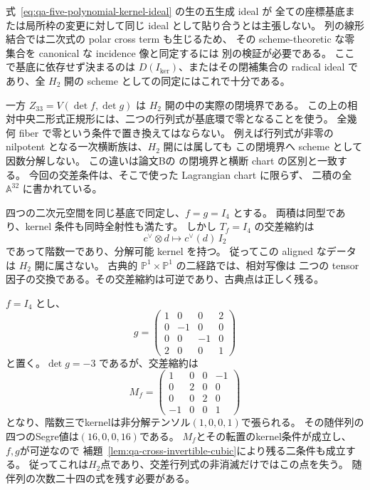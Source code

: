 \begin{remark}[idealのscheme構造と閉境界を区別する]
式~\eqref{eq:qa-five-polynomial-kernel-ideal} の生の五生成 ideal が
全ての座標基底または局所枠の変更に対して同じ ideal として貼り合うとは主張しない。
列の線形結合では二次式の polar cross term も生じるため、
その scheme-theoretic な零集合を canonical な incidence 像と同定するには
別の検証が必要である。
ここで基底に依存せず決まるのは $D(I_{\mathrm{ker}})$、またはその閉補集合の
radical ideal であり、全 $H_2$ 開の scheme としての同定にはこれで十分である。

一方 $Z_{33}=V(\det f,\det g)$ は $H_2$ 開の中の実際の閉境界である。
この上の相対中央二形式正規形には、二つの行列式が基底環で零となることを使う。
全幾何 fiber で零という条件で置き換えてはならない。
例えば行列式が非零の nilpotent となる一次横断族は、$H_2$ 開には属しても
この閉境界へ scheme として因数分解しない。
この違いは論文Bの
\cite[\texttt{prop:lagrangian-relative-double-rank-three},
\texttt{cor:lagrangian-open-closed-recognition}]{QuadricModuli2026}
の閉境界と横断 chart の区別と一致する。
今回の交差条件は、そこで使った Lagrangian chart に限らず、
二積の全 $\mathbb A^{32}$ に書かれている。
\end{remark}

\begin{example}[二積の可逆性だけでは足りない]
四つの二次元空間を同じ基底で同定し、$f=g=I_4$ とする。
両積は同型であり、kernel 条件も同時全射性も満たす。
しかし $T_f=I_4$ の交差縮約は
\[
 c^\vee\otimes d\longmapsto c^\vee(d)\,I_2
\]
であって階数一であり、分解可能 kernel を持つ。
従ってこの aligned なデータは $H_2$ 開に属さない。
古典的 $\mathbb P^1\times\mathbb P^1$ の二経路では、相対写像は
二つの tensor 因子の交換である。その交差縮約は可逆であり、古典点は正しく残る。
\end{example}


\begin{example}[次数二十四の条件が必要となる点]
$f=I_4$ とし、
\[
 g=\begin{pmatrix}
 1&0&0&2\\0&-1&0&0\\0&0&-1&0\\2&0&0&1
 \end{pmatrix}
\]
と置く。$\det g=-3$ であるが、交差縮約は
\[
 M_f=\begin{pmatrix}
 1&0&0&-1\\0&2&0&0\\0&0&2&0\\-1&0&0&1
 \end{pmatrix}
\]
となり、階数三でkernelは非分解テンソル$(1,0,0,1)$で張られる。
その随伴列の四つのSegre値は$(16,0,0,16)$である。
$M_f$とその転置のkernel条件が成立し、$f,g$が可逆なので
補題~\ref{lem:qa-cross-invertible-cubic}により残る二条件も成立する。
従ってこれは$H_2$点であり、交差行列式の非消滅だけではこの点を失う。
随伴列の次数二十四の式を残す必要がある。
\end{example}

